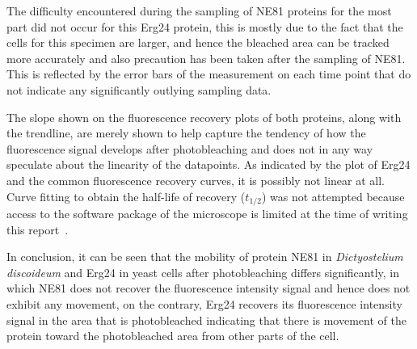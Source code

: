The difficulty encountered during the sampling of NE81 proteins for the most part did not occur for this Erg24 protein, this is mostly due to the fact that the cells for this specimen are larger, and hence the bleached area can be tracked more accurately and also precaution has been taken after the sampling of NE81. 
This is reflected by the error bars of the measurement on each time point that do not indicate any significantly outlying sampling data.

The slope shown on the fluorescence recovery plots of both proteins, along with the trendline, are merely shown to help capture the tendency of how the fluorescence signal develops after photobleaching and does not in any way speculate about the linearity of the datapoints. 
As indicated by the plot of Erg24 and the common fluorescence recovery curves, it is possibly not linear at all. 
Curve fitting to obtain the half-life of recovery ($t_{1/2}$) was not attempted because access to the software package of the microscope is limited at the time of writing this report~\cite{LectLCI}. 
 
In conclusion, it can be seen that the mobility of protein NE81 in \textit{Dictyostelium discoideum} and Erg24 in yeast cells after photobleaching differs significantly, in which NE81 does not recover the fluorescence intensity signal and hence does not exhibit any movement, on the contrary, Erg24 recovers its fluorescence intensity signal in the area that is photobleached indicating that there is movement of the protein toward the photobleached area from other parts of the cell.



\renewcommand{\refname}{\spacedlowsmallcaps{References}} %

%


